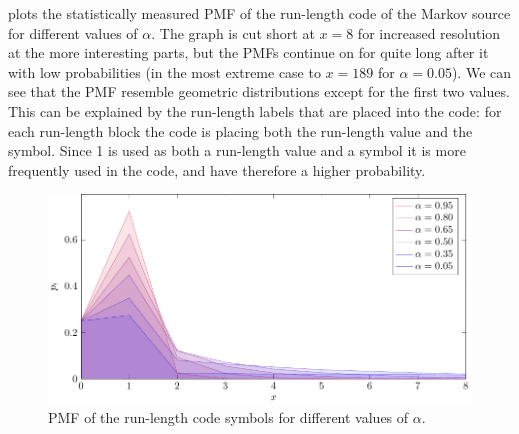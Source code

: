 \documentclass{article}
\begin{document}
 plots the statistically measured PMF of the run-length code of the Markov source
for different values of $\alpha$.
The graph is cut short at $x=8$ for increased resolution at the more interesting parts,
but the PMFs continue on for quite long after it with low probabilities
(in the most extreme case to $x=189$ for $\alpha=0.05$).
We can see that the PMF resemble geometric distributions except for the first two values.
This can be explained by the run-length labels that are placed into the code:
for each run-length block the code is placing both the run-length value and the symbol.
Since 1 is used as both a run-length value and a symbol it is more frequently used in the code,
and have therefore a higher probability.

\begin{figure}[!ht]
  \centering
  \includegraphics{../tikz/runlength_pmf/runlength_pmf.pdf}
  \caption{PMF of the run-length code symbols for different values of $\alpha$.}
  \label{fig:pmf}
\end{figure}
\end{document}
